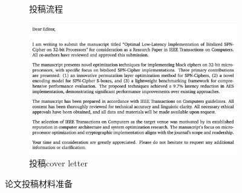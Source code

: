 \documentclass[11pt,a4paper]{article}
\begin{document}
\begin{figure}[h]
\begin{subfigure}[b]{0.2\textwidth}
    \caption{投稿流程}
    \label{fig:authorportal}
  \end{subfigure}
  \hfill
  \begin{subfigure}[b]{0.48\textwidth}
    \centering
    \includegraphics[width=\textwidth]{./fig/CoverLetter.png}
    \caption{投稿cover letter}
    \label{fig:coverletter}
  \end{subfigure}
  \caption{论文投稿材料准备}
  \label{fig:submission_materials}
\end{figure}





% 
% 
\end{document}
